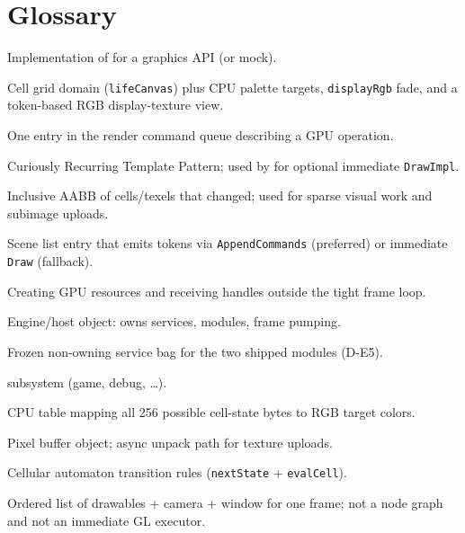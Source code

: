 \section{Glossary}
\label{sec:glossary}

\begin{description}[style=nextline, leftmargin=0pt]
  \item[Backend]
    Implementation of  for a graphics API (or mock).
  \item[Canvas]
    Cell grid domain (\texttt{lifeCanvas}) plus CPU palette targets,
    \texttt{displayRgb} fade, and a token-based RGB display-texture view.
  \item[Command / token]
    One entry in the render command queue describing a GPU operation.
  \item[CRTP]
    Curiously Recurring Template Pattern; used by  for
    optional immediate \texttt{DrawImpl}.
  \item[Dirty rect]
    Inclusive AABB of cells/texels that changed; used for sparse visual work
    and subimage uploads.
  \item[Drawable]
    Scene list entry that emits tokens via \texttt{AppendCommands} (preferred)
    or immediate \texttt{Draw} (fallback).
  \item[Enrollment]
    Creating GPU resources and receiving handles outside the tight frame loop.
  \item[Illumo]
    Engine/host object: owns services, modules, frame pumping.
  \item[IllumoContext]
    Frozen non-owning service bag for the two shipped modules (D-E5).
  \item[Module]
     subsystem (game, debug, \ldots).
  \item[Palette]
    CPU table mapping all 256 possible cell-state bytes to RGB target colors.
  \item[PBO]
    Pixel buffer object; async unpack path for texture uploads.
  \item[RuleSet]
    Cellular automaton transition rules (\texttt{nextState} + \texttt{evalCell}).
  \item[Scene]
    Ordered list of drawables + camera + window for one frame; not a node graph
    and not an immediate GL executor.
\end{description}
